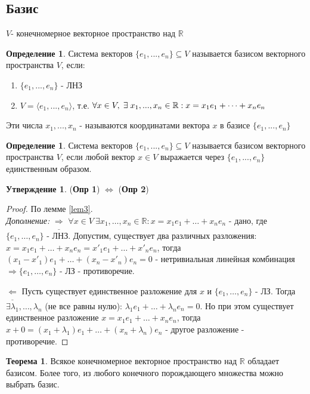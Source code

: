 \documentclass[a4paper, 12pt]{article}
\newcommand{\R}{\mathbb R}
\newcommand\tab[1][.5cm]{\hspace*{#1}}
\newcounter{defcount}
\theoremstyle{definition}
\newtheorem*{theorem}{Теорема}
\newtheorem*{subtheorem}{Утверждение}
\newtheorem{definitionnum}[defcount]{Определение}
\begin{document}
\subsection{Базис}
$V$- конечномерное векторное пространство над $\R$ 
\begin{definitionnum}
  Система векторов $\{e_1,...,e_n\}\subseteq V$ называется базисом векторного пространства $V$, если:
  \begin{enumerate}
    \item $\{e_1,...,e_n\}$ - ЛНЗ
    \item $V = \langle e_1,...,e_n \rangle$, т.е. $\forall x \in V, \tab[0.1cm] \exists \tab[0.1cm] x_1,...,x_n \in \R: x = x_1e_1+\cdots + x_ne_n$  
  \end{enumerate}
  Эти числа $x_1,...,x_n$ - называются координатами вектора $x$ в базисе $\{e_1,...,e_n\}$ 
\end{definitionnum} 
\begin{definitionnum}
  Система векторов $\{e_1,...,e_n\} \subseteq V$ называется базисом векторного пространства $V$, если любой вектор $x \in V$ выражается через $\{e_1,...,e_n\}$ единственным образом.
\end{definitionnum} 
  \begin{subtheorem}
    (\textbf{Опр 1}) $\Longleftrightarrow $ (\textbf{Опр 2})
  \end{subtheorem} 
  \begin{proof}
    По лемме \eqref{lem3}. \\
    \textit{Дополнение:} $\underline{\Longrightarrow}$
    $\forall x \in V \ \exists x_1, \dots, x_n \in \R: x = x_1 e_1 + \dots + x_n e_n$ - дано, где $\{e_1, \dots, e_n\}$ - ЛНЗ.
    Допустим, существует два различных разложения:
    $x = x_1 e_1 + \dots + x_n e_n = x'_1 e_1 + \dots + x'_n e_n$, тогда
    $(x_1 - x'_1) e_1 + \dots + (x_n - x'_n) e_n = 0$ - нетривиальная линейная комбинация $\Rightarrow \{e_1, \dots, e_n\}$ - ЛЗ - противоречие.

    $\underline{\Longleftarrow}$ Пусть существует единственное разложение для $x$ и $\{e_1, \dots, e_n\}$ - ЛЗ. Тогда $\exists \lambda_1, \dots, \lambda_n$ (не все равны нулю): $\lambda_1 e_1 + \dots + \lambda_n e_n = 0$. Но при этом существует единственное разложение $x = x_1 e_1 + \dots + x_n e_n$, тогда $x + 0 = (x_1 + \lambda_1) e_1 + \dots + (x_n + \lambda_n) e_n$ - другое разложение - противоречие.
  \end{proof}
  \begin{theorem}
    Всякое конечномерное векторное пространство над $\R$ обладает базисом. Более того, из любого конечного порождающего множества можно выбрать базис.
  \end{theorem} 
\end{document}
